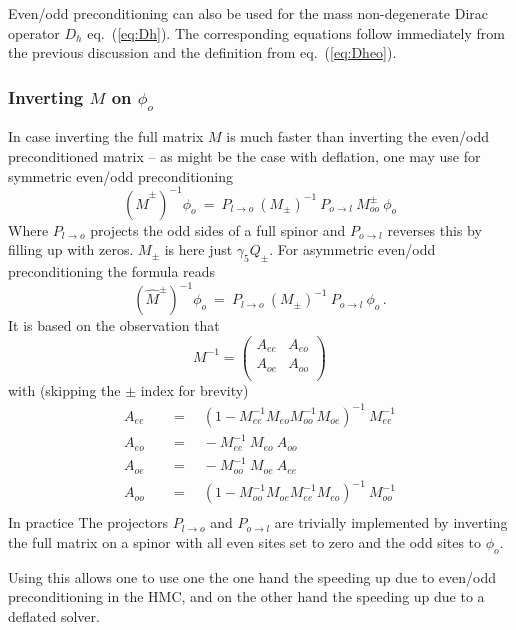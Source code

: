 Even/odd preconditioning can also be used for the mass non-degenerate
Dirac operator $D_h$ eq.~(\ref{eq:Dh}). The corresponding equations
follow immediately from the previous discussion and the definition
from eq.~(\ref{eq:Dheo}).

\subsubsection{Inverting $M$ on $\phi_o$}

In case inverting the full matrix $M$ is much faster than inverting
the even/odd preconditioned matrix -- as might be the case with
deflation, one may use for symmetric even/odd preconditioning
\begin{equation}
  (\hat M^\pm)^{-1}\phi_o\ =\ P_{l\to o}\ (M_\pm)^{-1}\ P_{o\to l}\
  M^\pm_{oo}\ \phi_o
\end{equation}
Where $P_{l\to o}$ projects the odd sides of a full spinor and
$P_{o\to l}$ reverses this by filling up with zeros. $M_\pm$ is here just
$\gamma_5 Q_\pm$. For asymmetric even/odd preconditioning the formula
reads
\begin{equation}
  (\hat M^\pm)^{-1}\phi_o\ =\ P_{l\to o}\ (M_\pm)^{-1}\ P_{o\to l}\
  \phi_o\, .
\end{equation}
It is based on the observation that
\[
M^{-1} = 
\begin{pmatrix}
  A_{ee} & A_{eo} \\
  A_{oe} & A_{oo} \\
\end{pmatrix}
\]
with (skipping the $\pm$ index for brevity)
\[
\begin{split}
  A_{ee}\quad &=\quad (1- M_{ee}^{-1} M_{eo} M_{oo}^{-1} M_{oe})^{-1}\ M_{ee}^{-1} \\
  A_{eo}\quad &=\quad -M_{ee}^{-1}\ M_{eo}\ A_{oo} \\
  A_{oe}\quad &=\quad -M_{oo}^{-1}\ M_{oe}\ A_{ee} \\
  A_{oo}\quad &=\quad (1- M_{oo}^{-1} M_{oe} M_{ee}^{-1} M_{eo})^{-1}\ M_{oo}^{-1} \\
\end{split}
\]
In practice The projectors $P_{l\to o}$ and $P_{o\to l}$ are trivially
implemented by inverting the full matrix on a spinor with all even
sites set to zero and the odd sites to $\phi_o$.

Using this allows one to use one the one hand the speeding up due to
even/odd preconditioning in the HMC, and on the other hand the
speeding up due to a deflated solver.

\endinput

